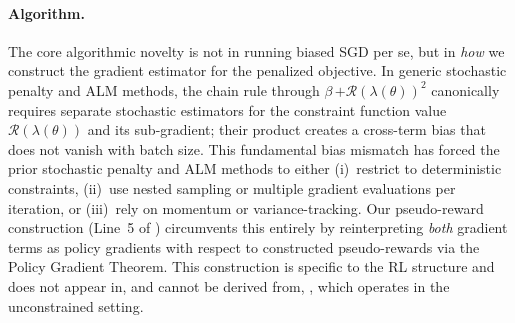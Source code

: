 \documentclass{article}
\theoremstyle{plain}
\theoremstyle{definition}
\theoremstyle{remark}
\DeclarePairedDelimiter{\plus}{[}{]_{+}}
\newcommand{\pen}[1]{{\plus{#1}^2}}
\def\Reg{{\mathcal{R}}}
\begin{document}
\paragraph{Algorithm.}
The core algorithmic novelty is not in running biased SGD per se, but in
\emph{how} we construct the gradient estimator for the penalized objective.
In generic stochastic penalty and ALM methods, the chain rule through
$\beta\,\pen{\Reg(\lambda(\theta))}$ canonically requires separate
stochastic estimators for the constraint function value
$\Reg(\lambda(\theta))$ and its sub-gradient; their product creates a
cross-term bias that does not vanish with batch size. This fundamental bias
mismatch has forced the prior stochastic penalty and ALM methods to either
(i)~restrict to deterministic constraints, (ii)~use nested sampling or
multiple gradient evaluations per iteration, or (iii)~rely on momentum or
variance-tracking. Our pseudo-reward construction (Line~5 of
) circumvents this entirely by reinterpreting
\emph{both} gradient terms as policy gradients with respect to constructed
pseudo-rewards via the Policy Gradient Theorem. This construction is
specific to the RL structure and does not appear in, and cannot be derived
from, \citet{zhangVariationalPolicyGradient2020}, which operates in the
unconstrained setting.
\end{document}
